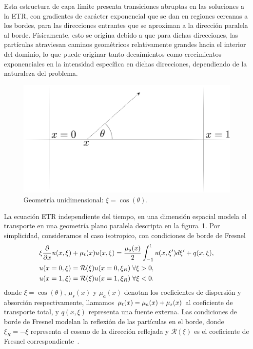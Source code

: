 Esta estructura de capa límite presenta transiciones abruptas 
en las soluciones a la ETR, con gradientes de carácter exponencial 
que se dan en regiones cercanas a los bordes, para las direcciones 
entrantes que se aproximan a la dirección paralela al borde. 
Físicamente, esto se origina debido a que para dichas direcciones, 
las partículas atraviesan caminos geométricos relativamente grandes 
hacia el interior del dominio, lo que puede originar tanto decaímientos 
como crecimientos exponenciales en la intensidad específica en dichas direcciones, 
dependiendo de la naturaleza del problema.
\begin{figure}[h!]
\centering
  \includegraphics[width=0.5\linewidth]{figuras/geom.pdf}
  \caption{Geometría unidimensional: $\xi = \cos(\theta)$.}
 \label{fig:parallelgeom}
\end{figure}
La ecuación ETR independiente del tiempo, en una dimensión espacial 
modela el transporte en una geometría plano paralela descripta en la 
figura~\ref{fig:parallelgeom}. Por simplicidad, consideramos 
el caso isotropico, con condiciones de borde de Fresnel
\begin{equation}
\begin{split}
  &\xi \frac{\partial}{\partial x}u(x,\xi)+\mu_t(x)u(x,\xi)=   \frac{\mu_s(x)}{2} \int_{-1}^{1}u(x,\xi') d\xi' +q(x,\xi),\\
  &u(x=0,\xi)=\mathcal{R}(\xi)u(x=0,\xi_R) \; \forall \xi>0,\\
  &u(x=1,\xi)=\mathcal{R}(\xi)u(x=1,\xi_R) \; \forall \xi<0.
\end{split}
\label{eq:transp1d}
\end{equation}
donde $\xi=\cos(\theta)$,  $\mu_s(x)$ y $\mu_a(x)$ denotan 
los coeficientes de dispersión y absorción respectivamente, 
llamamos $\mu_t(x)=\mu_a(x)+\mu_s(x)$ al coeficiente de transporte 
total, y $q(x,\xi)$ representa una fuente externa. Las condiciones de 
borde de Fresnel modelan la reflexión de las partículas en el borde, 
donde $\xi_R=-\xi$ representa el coseno de la dirección reflejada 
y $\mathcal{R}(\xi)$ es el coeficiente de Fresnel correspondiente~\cite{Born1999}.

